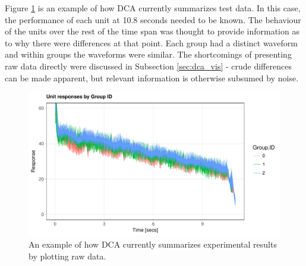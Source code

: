 \documentclass[11pt,a4paper,article]{memoir} %
\begin{document}
  Figure \ref{fig:imitation_line_chart} is an example of how DCA currently summarizes test data. In this case, the performance of each unit at 10.8 seconds needed to be known. The behaviour of the units over the rest of the time span was thought to provide information as to why there were differences at that point. Each group had a distinct waveform and within groups the waveforms were similar. The shortcomings of presenting raw data directly were discussed in Subsection \ref{sec:dca_vis} - crude differences can be made apparent, but relevant information is otherwise subsumed by noise.
  
   \begin{figure}[h!]
\includegraphics[width=\textwidth]{imitation_line_chart.pdf}
\caption{An example of how DCA currently summarizes experimental results by plotting raw data.}
\label{fig:imitation_line_chart}
\end{figure}
  
\end{document}
